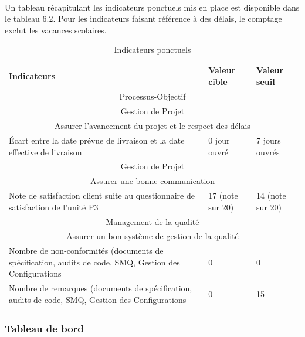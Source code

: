 \paragraph*{} Un tableau récapitulant les indicateurs ponctuels mis en place est disponible dans le tableau
6.2. Pour les indicateurs faisant référence à des délais, le comptage exclut les vacances scolaires.
\begin{table}[H]
\begin{tabular}[h]{|p{}|p{}|p{}|}
	\hline
	\rowcolor[gray]{0.85}
	Indicateurs & Valeur cible & Valeur seuil \\\hline
	\multicolumn{3}{|c|}{Processus-Objectif} \\\hline
	\multicolumn{3}{|c|}{\cellcolor[gray]{0.85} Gestion de Projet} \\
	\multicolumn{3}{|c|}{\cellcolor[gray]{0.85} Assurer l'avancement du projet et le respect des délais} \\\hline
	Écart entre la date prévue de livraison et la date effective de livraison & 0 jour ouvré & 7 jours ouvrés  \\\hline
	\multicolumn{3}{|c|}{\cellcolor[gray]{0.85} Gestion de Projet} \\
	\multicolumn{3}{|c|}{\cellcolor[gray]{0.85} Assurer une bonne communication} \\\hline
	Note de satisfaction client suite au questionnaire de satisfaction de l'unité P3 & 17 (note sur 20) & 14 (note sur 20) \\\hline
	\multicolumn{3}{|c|}{\cellcolor[gray]{0.85} Management de la qualité} \\
	\multicolumn{3}{|c|}{\cellcolor[gray]{0.85} Assurer un bon système de gestion de la qualité} \\\hline
	Nombre de non-conformités (documents de spécification, audits de code, SMQ, Gestion des Configurations & 0 & 0 \\\hline
	Nombre de remarques (documents de spécification, audits de code, SMQ, Gestion des Configurations & 0 & 15 \\\hline
	
\end{tabular}
\caption{Indicateurs ponctuels} \label{Tableau 6.2}
\end{table}

\subsubsection*{Tableau de bord}
\label{Tableau de bord}

